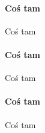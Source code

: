 \documentclass[a4paper,10pt,oneside]{book}
\begin{document}
\begin{sloppypar}
	\paragraph{Coś tam}
	Coś tam
	
	\paragraph{Coś tam}
	Coś tam
	
	\paragraph{Coś tam}
	Coś tam
	\\[0.7cm]
	
\clearpage
%

\end{sloppypar}
\end{document}
